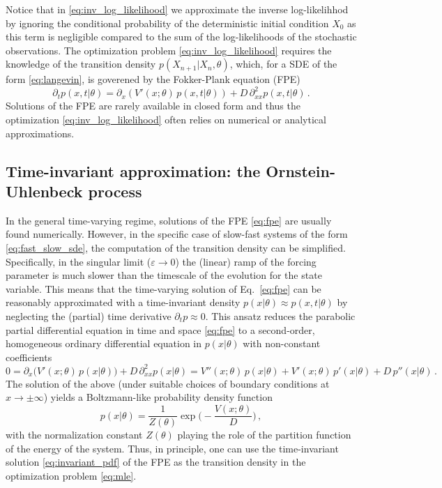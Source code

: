 \documentclass[a4paper,fleqn]{cas-sc}
\begin{document}
%
Notice that in \eqref{eq:inv_log_likelihood} we approximate the inverse log-likelihhod by ignoring the conditional probability of the deterministic initial condition $X_{0}$ as this term is negligible compared to the sum of the log-likelihoods of the stochastic observations. 
The optimization problem \eqref{eq:inv_log_likelihood} requires the knowledge of the transition density $p(X_{n+1}|X_{n},\theta)$, which, for a SDE of the form \eqref{eq:langevin}, is goverened by the Fokker-Plank equation (FPE)
%
\begin{equation}\label{eq:fpe}
        \partial_{t}p(x,t|\theta) = \partial_{x}(V'(x;\theta)\,p(x,t|\theta)) + D\,\partial_{xx}^{2}p(x,t|\theta)\,.
\end{equation}
%
Solutions of the FPE are rarely available in closed form and thus the optimization \eqref{eq:inv_log_likelihood} often relies on numerical or analytical approximations. 
%
\subsection{Time-invariant approximation: the Ornstein-Uhlenbeck process}\label{subsec:oup}
In the general time-varying regime, solutions of the FPE \eqref{eq:fpe} are usually found numerically.
However, in the specific case of slow-fast systems of the form \eqref{eq:fast_slow_sde}, the computation of the transition density can be simplified. 
Specifically, in the singular limit ($\varepsilon\to0$) the (linear) ramp of the forcing parameter is much slower than the timescale of the evolution for the state variable. 
This means that the time-varying solution of Eq.~\eqref{eq:fpe} can be reasonably approximated with a time-invariant density $p(x|\theta)\approx p(x,t|\theta)$ by neglecting the (partial) time derivative $\partial_{t}p\approx0$.
This ansatz reduces the parabolic partial differential equation in time and space \eqref{eq:fpe} to a second-order, homogeneous ordinary differential equation in $p(x|\theta)$ with non-constant coefficients
%
\begin{equation}\label{eq:stationary_fpe}
        0 = \partial_{x}\big(V'(x;\theta)\,p(x|\theta)\big) + D\,\partial_{xx}^{2}p(x|\theta) = V''(x;\theta)\,p(x|\theta) + V'(x;\theta)\,p'(x|\theta) + D\,p''(x|\theta)\,.
\end{equation}
%
The solution of the above (under suitable choices of boundary conditions at $x\to\pm\infty$) yields a Boltzmann-like probability density function \cite[Ch. 5, p. 98]{Risken1989}
%
\begin{equation}\label{eq:invariant_pdf}
        p(x|\theta) = \frac{1}{Z(\theta)}\exp\bigg(-\frac{V(x;\theta)}{D}\bigg)\,,
\end{equation}
%
with the normalization constant $Z(\theta)$ playing the role of the partition function of the energy of the system.
Thus, in principle, one can use the time-invariant solution \eqref{eq:invariant_pdf} of the FPE as the transition density in the optimization problem \eqref{eq:mle}.
\end{document}

